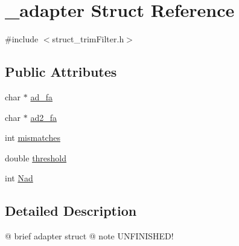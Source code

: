 \hypertarget{struct__adapter}{\section{\+\_\+adapter Struct Reference}
\label{struct__adapter}
}


{\ttfamily \#include $<$struct\+\_\+trim\+Filter.\+h$>$}

\subsection*{Public Attributes}
\begin{DoxyCompactItemize}
\item 
char $\ast$ \hyperlink{struct__adapter_ad05cb8ebdfbb0728b8069ed17c7d264c}{ad\+\_\+fa}
\item 
char $\ast$ \hyperlink{struct__adapter_a3e3ff61737be3da0dcab7911ca6ca7c3}{ad2\+\_\+fa}
\item 
int \hyperlink{struct__adapter_a51c6998b13837c66f79b3a1dd3c11995}{mismatches}
\item 
double \hyperlink{struct__adapter_a2d1273cfaa0d51c79f331b92ed2342b4}{threshold}
\item 
int \hyperlink{struct__adapter_aed006c3b66849e781049076b11f297d3}{Nad}
\end{DoxyCompactItemize}


\subsection{Detailed Description}
@ brief adapter struct @ note U\+N\+F\+I\+N\+I\+S\+H\+E\+D! 

